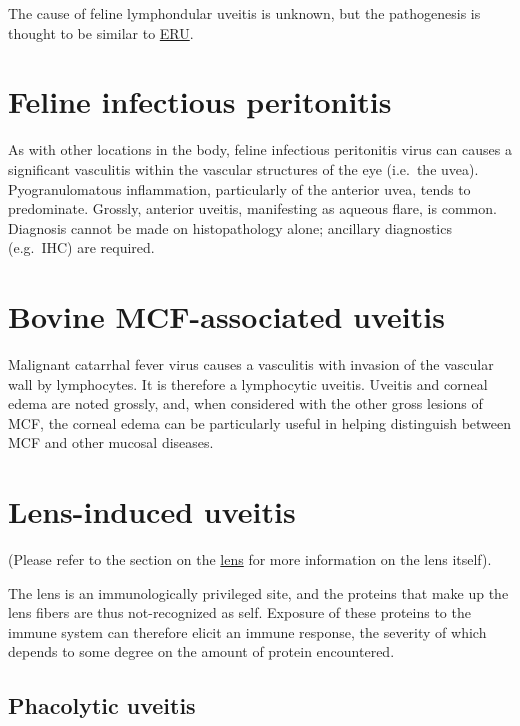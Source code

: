 \documentclass[openany]{book}
\begin{document}
The cause of feline lymphondular uveitis is unknown, but the
pathogenesis is thought to be similar to
\protect\hyperlink{equine-recurrent-uveitis}{ERU}.

\section{Feline infectious
peritonitis}\label{feline-infectious-peritonitis}

As with other locations in the body, feline infectious peritonitis virus
can causes a significant vasculitis within the vascular structures of
the eye (i.e.~the uvea). Pyogranulomatous inflammation, particularly of
the anterior uvea, tends to predominate. Grossly, anterior uveitis,
manifesting as aqueous flare, is common. Diagnosis cannot be made on
histopathology alone; ancillary diagnostics (e.g.~IHC) are required.

\section{Bovine MCF-associated
uveitis}\label{bovine-mcf-associated-uveitis}

Malignant catarrhal fever virus causes a vasculitis with invasion of the
vascular wall by lymphocytes. It is therefore a lymphocytic uveitis.
Uveitis and corneal edema are noted grossly, and, when considered with
the other gross lesions of MCF, the corneal edema can be particularly
useful in helping distinguish between MCF and other mucosal diseases.

\section{Lens-induced uveitis}\label{lens-induced-uveitis}

(Please refer to the section on the
\protect\hyperlink{pathology-of-the-lens}{lens} for more information on
the lens itself).

The lens is an immunologically privileged site, and the proteins that
make up the lens fibers are thus not-recognized as self. Exposure of
these proteins to the immune system can therefore elicit an immune
response, the severity of which depends to some degree on the amount of
protein encountered.

\subsection{Phacolytic uveitis}\label{phacolytic-uveitis}
\end{document}
